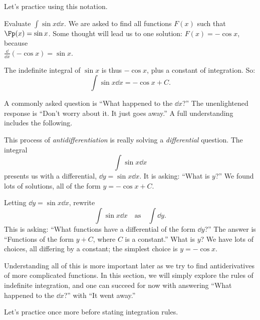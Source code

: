 Let's practice using this notation.

\begin{example}\label{ex_anti2}
Evaluate $\displaystyle \int \sin x\dd x$.
\solution
We are asked to find all functions $F(x)$ such that $\Fp(x) = \sin x$. Some thought will lead us to one solution: $F(x) = -\cos x$, because\\
$\frac{\dd}{\dd x}(-\cos x) = \sin x$.

The indefinite integral of $\sin x$ is thus $-\cos x$, plus a constant of integration. So:
\[\int \sin x \dd x = -\cos x + C.\]
\end{example}

A commonly asked question is ``What happened to the $\dd x$?'' The unenlightened response is ``Don't worry about it. It just goes away.'' A full understanding includes the following.


This process of \emph{antidifferentiation} is really solving a \emph{differential} question. The integral
\[\int \sin x\dd x\]
presents us with a differential, $\dd y = \sin x\dd x$. It is asking: ``What is $y$?'' We found lots of solutions, all of the form $y = -\cos x+C$.

Letting $\dd y = \sin x\dd x$,  rewrite 
\[\int \sin x \dd x \quad \text{as}\quad \int \dd y.\]
This is asking: ``What functions have a differential of the form $\dd y$?'' The answer is ``Functions of the form $y+C$, where $C$ is a constant.'' What is $y$? We have lots of choices, all differing by a constant; the simplest choice is $y = -\cos x$.

Understanding all of this is more important later as we try to find antiderivatives of more complicated functions. In this section, we will simply explore the rules of indefinite integration, and one can succeed for now with answering ``What happened to the $\dd x$?'' with ``It went away.''

Let's practice once more before stating integration rules.

